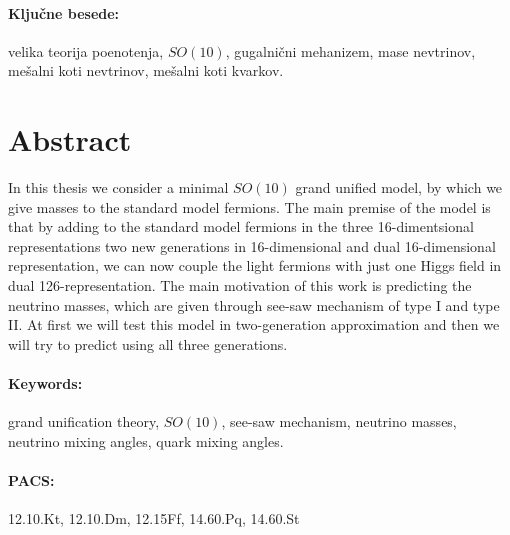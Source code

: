 \paragraph{Ključne besede:} velika teorija poenotenja, $SO(10)$, gugalnični mehanizem, mase nevtrinov, mešalni
koti nevtrinov, mešalni koti kvarkov.

\vfill

\newpage
\thispagestyle{empty}
\null
\newpage
\vfill

\thispagestyle{empty}
\vspace{5cm}
\section*{Abstract}

In this thesis we consider a minimal $SO(10)$ grand unified model, by which we give masses to the standard
model fermions. The main premise of the model is that by adding to the standard model fermions in the
three 16-dimentsional representations two new generations in 16-dimensional and dual 16-dimensional
representation, we can now couple the light fermions with just one Higgs field in dual 126-representation.
The main motivation of this work is predicting the neutrino masses, which are given through see-saw mechanism
of type I and type II. At first we will test this model in two-generation approximation and then we will try to
predict using all three generations.

\vspace{10pt}
\paragraph{Keywords:} grand unification theory, $SO(10)$, see-saw mechanism,  neutrino masses, neutrino mixing
angles, quark mixing angles.

\vspace{10pt}
\paragraph{PACS:} 12.10.Kt, 12.10.Dm, 12.15Ff, 14.60.Pq, 14.60.St
\vfill

\newpage
\thispagestyle{empty}
\null